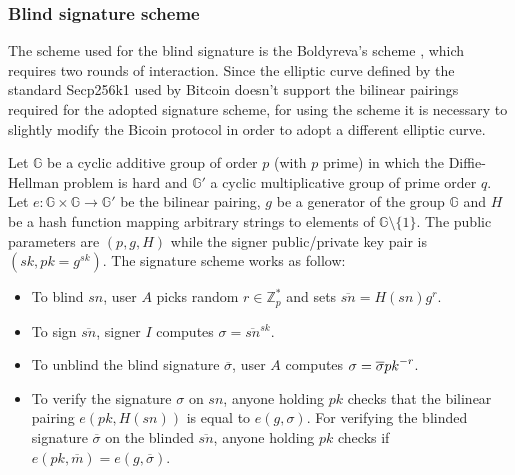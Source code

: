 \subsubsection{Blind signature scheme} The scheme used for the blind signature
is the Boldyreva’s scheme \cite{boldyreva2003threshold}, which requires two
rounds of interaction. Since the elliptic curve defined by the standard
Secp256k1 used by Bitcoin doesn't support the bilinear pairings required for the
adopted signature scheme, for using the scheme it is necessary to slightly
modify the Bicoin protocol in order to adopt a different elliptic curve.

Let $\mathbb{G}$ be a cyclic additive group of order $p$ (with $p$ prime) in
which the Diffie-Hellman problem is hard and $\mathbb{G'}$ a cyclic
multiplicative group of prime order $q$. Let $e\colon
\mathbb{G}\times\mathbb{G}\to\mathbb{G'}$ be the bilinear pairing, $g$ be a
generator of the group $\mathbb{G}$ and $H$ be a hash function mapping arbitrary
strings to elements of $\mathbb{G}\setminus \{1\}$. The public parameters are
$(p, g, H)$ while the signer public/private key pair is $(sk , pk = g^{sk})$.
The signature scheme works as follow:
\begin{itemize}
  \item To blind $sn$, user $A$ picks random $r\in \mathbb{Z}^{*}_p$ and sets
  $\overline{sn}=H(sn)g^r$.
  \item To sign $\overline{sn}$, signer $I$ computes $\sigma = \overline{sn}^{sk}$.
  \item To unblind the blind signature $\overline{\sigma}$, user $A$ computes
  $\sigma = \overline{\sigma} {pk}^{\-- r}$.
  \item To verify the signature $\sigma$ on $sn$, anyone holding $pk$ checks
  that the bilinear pairing $e(pk,H(sn))$ is equal to $e(g,\sigma)$.
  For verifying the blinded signature $\overline\sigma$ on the blinded
  $\overline{sn}$, anyone holding $pk$ checks if $e(pk,\overline m)= e(g,\overline\sigma)$.
\end{itemize}


